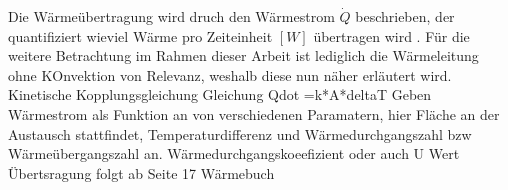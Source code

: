 Die Wärmeübertragung wird druch den Wärmestrom $\dot{Q}$ beschrieben, der quantifiziert wieviel Wärme pro Zeiteinheit $[W]$ übertragen wird \cite[S.~5]{bo14}.
Für die weitere Betrachtung im Rahmen dieser Arbeit ist lediglich die Wärmeleitung ohne KOnvektion von Relevanz, weshalb diese nun näher erläutert wird.
Kinetische Kopplungsgleichung\cite[S.~7]{bo14}
Gleichung Qdot =k*A*deltaT
Geben Wärmestrom als Funktion an von verschiedenen Paramatern, hier Fläche an der Austausch stattfindet, Temperaturdifferenz und Wärmedurchgangszahl bzw Wärmeübergangszahl an.
Wärmedurchgangskoeefizient oder auch U Wert
Übertsragung folgt ab Seite 17 Wärmebuch

